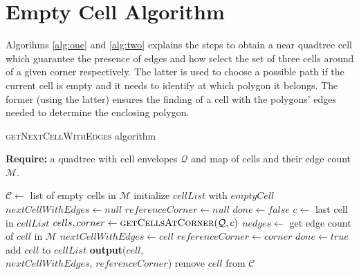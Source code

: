 \section{Empty Cell Algorithm}\label{app:emptycells}
Algorihms \ref{alg:one} and \ref{alg:two} explains the steps to obtain a near quadtree cell which guarantee the presence of edges and how select the set of three cells around of a given corner respectively.  The latter is used to choose a possible path if the current cell is empty and it needs to identify at which polygon it belongs.  The former (using the latter) ensures the finding of a cell with the polygons' edges needed to determine the enclosing polygon.

\begin{algorithm}\caption{\textsc{getNextCellWithEdges} algorithm}\label{alg:one}
    \textbf{Require:} a quadtree with cell envelopes $\mathcal Q$ and map of cells and their edge count $\mathcal M$.
    \begin{algorithmic}[1]
        \State $\mathcal C \gets $ list of empty cells in $\mathcal M$
            \State initialize $cellList$ with $emptyCell$ 
            \State $nextCellWithEdges \gets null$
            \State $referenceCorner \gets null$
            \State $done \gets false$
                \State $c \gets $ last cell in $cellList$ 
                \State $cells, corner \gets \textsc{getCellsAtCorner}(\mathcal Q, c)$ 
                    \State $nedges \gets$ get edge count of $cell$ in $\mathcal M$ 
                        \State $nextCellWithEdges \gets cell$
                        \State $referenceCorner \gets corner$
                        \State $done \gets true$
                    \Else
                        \State add $cell$ to $cellList$
                    \EndIf
                \EndFor
            \EndWhile
                \State \textbf{output}($cell$, \\
                \hspace{2.5cm} $nextCellWithEdges$, $referenceCorner$)
                \State remove $cell$ from $\mathcal C$
            \EndFor
        \EndFor
    \EndFunction
    \end{algorithmic}
\end{algorithm}

